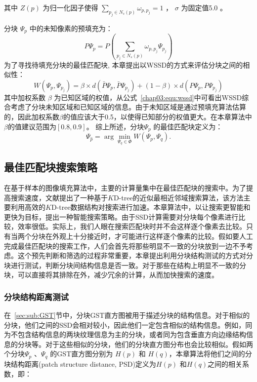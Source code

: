  其中 \(Z(p)\) 为归一化因子使得 $\sum_{p_j\in N_s(p)}\omega_{p,p_j} = 1$ ，
\(\sigma\) 为固定值5.0 \cite{Xu:2010}。\par
 分块 \(\Psi_p\) 中的未知像素的预填充为：
 $$P\Psi_p=P\left(\sum_{p_j \in N_s(p)}{\omega_{p,p_j}\Psi_{p_j}}\right)$$
 为了寻找待填充分块的最佳匹配块, 本章提出以WSSD的方式来评估分块之间的相似性：
 \begin{equation}
 W(\Psi_p,\Psi_{p_j})=\beta\times d(\bar{P}\Psi_p,\bar{P}\Psi_{p_j})+(1-\beta)\times d(P\Psi_p,P\Psi_{p_j})
 \label{chap03:equ:wssd}
 \end{equation}
 其中加权系数 \(\beta\) 为已知区域的权值，从公式~\ref{chap03:equ:wssd}中可看出WSSD综合考虑了分块未知区域和已知区域的信息。由于未知区域是通过预填充算法估算的，因此加权系数\(\beta\)的值应该大于0.5，以使得已知部分的权值更大。在本章算法中 \(\beta\)的值建议范围为$[0.8, 0.9]$。 综上所述，分块\(\Psi_p\) 的最佳匹配块定义为：
  $$\Psi_{\hat{p}}= \arg\min_{\Psi_q \in \Phi}{W(\Psi_p,\Psi_q)}.$$


 \subsection{最佳匹配块搜索策略}
 在基于样本的图像填充算法中，主要的计算量集中在最佳匹配块的搜索中。为了提高搜索速度，文献提出了一种基于$K$D-tree的近似最相近邻域搜索算法，该方法主要利用高效的$K$D-tree数据结构对搜索进行加速。本章算法中，以让搜索更智能和更快为目标，提出一种智能搜索策略。由于SSD计算需要对分块每个像素进行比较，效率很低。实际上，我们人眼在搜索匹配块时并不会这样逐个像素去比较。只有当两个分块在外观上十分接近时，才可能进行这样逐个像素的比较。假如要人工完成最佳匹配块的搜索工作，人们会首先将那些明显不一致的分块放到一边不予考虑。这个预先判断和筛选的过程非常重要，本章提出利用分块结构测试的方式对分块进行测试，判断分块间结构信息是否一致。对于那些在结构上明显不一致的分块，可以直接将其排除在外，减少冗余的计算，从而加快搜索的速度。
 \subsubsection{分块结构距离测试}
 \label{sec:subsub:PST}
 在~\ref{sec:sub:GST}节中，分块GST直方图被用于描述分块的结构信息。对于相似的分块，他们之间的SSD会相对较小，因此他们一定包含相似的结构信息。例如，同为不包含结构信息的两块纹理信息为主的分块，或者同为包含垂直方向边缘结构信息的分块等。对于这些相似的分块，他们的分块直方图分布也会比较相似。假如两个分块\(\Psi_p\) 、\(\Psi_q\) 的GST直方图分别为 \(H(p)\) 和 \(H(q)\)，本章算法将他们之间的分块结构距离(patch structure distance, PSD)定义为\(H(p)\) 和\(H(q)\)之间的相关系数，即：

